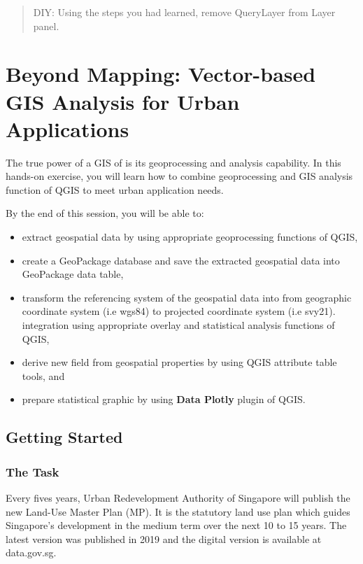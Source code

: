 \documentclass[
  letterpaper,
  DIV=11,
  numbers=noendperiod]{scrreprt}
\begin{document}
\begin{quote}
DIY: Using the steps you had learned, remove QueryLayer from Layer
panel.
\end{quote}


\hypertarget{beyond-mapping-vector-based-gis-analysis-for-urban-applications}{%
\chapter{Beyond Mapping: Vector-based GIS Analysis for Urban
Applications}\label{beyond-mapping-vector-based-gis-analysis-for-urban-applications}}

The true power of a GIS of is its geoprocessing and analysis capability.
In this hands-on exercise, you will learn how to combine geoprocessing
and GIS analysis function of QGIS to meet urban application needs.

By the end of this session, you will be able to:

\begin{itemize}
\item
  extract geospatial data by using appropriate geoprocessing functions
  of QGIS,
\item
  create a GeoPackage database and save the extracted geospatial data
  into GeoPackage data table,
\item
  transform the referencing system of the geospatial data into from
  geographic coordinate system (i.e wgs84) to projected coordinate
  system (i.e svy21). integration using appropriate overlay and
  statistical analysis functions of QGIS,
\item
  derive new field from geospatial properties by using QGIS attribute
  table tools, and
\item
  prepare statistical graphic by using \textbf{Data Plotly} plugin of
  QGIS.
\end{itemize}

\hypertarget{getting-started-2}{%
\section{Getting Started}\label{getting-started-2}}

\hypertarget{the-task}{%
\subsection{The Task}\label{the-task}}

Every fives years, Urban Redevelopment Authority of Singapore will
publish the new Land-Use Master Plan (MP). It is the statutory land use
plan which guides Singapore's development in the medium term over the
next 10 to 15 years. The latest version was published in 2019 and the
digital version is available at data.gov.sg.
\end{document}
